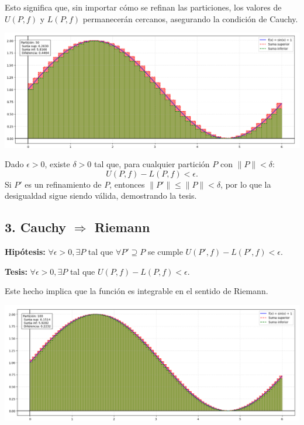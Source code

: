 \documentclass{article}
\begin{document}
Esto significa que, sin importar cómo se refinan las particiones, los valores de $U(P, f)$ y $L(P, f)$ permanecerán cercanos, asegurando la condición de Cauchy.

\begin{center}
    \includegraphics[width=1\textwidth]{Figure_2.png}
\end{center}

Dado $\epsilon > 0$, existe $\delta > 0$ tal que, para cualquier partición $P$ con $\lVert P \rVert < \delta$:
\[
U(P, f) - L(P, f) < \epsilon.
\]
Si $P'$ es un refinamiento de $P$, entonces $\lVert P' \rVert \leq \lVert P \rVert < \delta$, por lo que la desigualdad sigue siendo válida, demostrando la tesis.

\subsection*{3. Cauchy $\Rightarrow$ Riemann}
\textbf{Hipótesis:} $\forall \epsilon > 0, \exists P$ tal que $\forall P' \supseteq P$ se cumple $U(P', f) - L(P', f) < \epsilon$.

\textbf{Tesis:} $\forall \epsilon > 0, \exists P$ tal que $U(P, f) - L(P, f) < \epsilon$.

Este hecho implica que la función es integrable en el sentido de Riemann.

\begin{center}
    \includegraphics[width=1\textwidth]{Figure_3.png}
\end{center}
\end{document}
